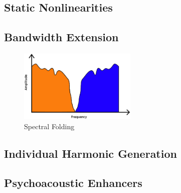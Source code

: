 	\subsection{Static Nonlinearities}
	\label{sec:Excitation-Statics}

	\subsection{Bandwidth Extension}
	\label{sec:Excitation-BWE}
		\begin{figure}[h!]
			\centering
			\includegraphics[width=0.5\textwidth]{Chapter3/Images/SpectralFolding.eps}
			\caption{Spectral Folding}
			\label{fig:SpectralFolding}
		\end{figure}

	\subsection{Individual Harmonic Generation}
	\label{sec:Excitation-Individuals}

	\subsection{Psychoacoustic Enhancers}
	\label{sec:Excitation-Enhancers}
